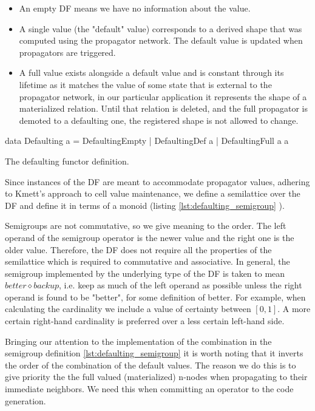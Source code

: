 \begin{itemize}
\item An empty DF means we have no information about the value.
\item A single value (the "default" value) corresponds to a derived
  shape that was computed using the propagator network. The default
  value is updated when propagators are triggered.
\item A full value exists alongside a default value and is constant
  through its lifetime as it matches the value of some state that is
  external to the propagator network, in our particular application it
  represents the shape of a materialized relation. Until that relation
  is deleted, and the full propagator is demoted to a defaulting one,
  the registered shape is not allowed to change.
\end{itemize}

\begin{code}
  \begin{haskellcode}
    data Defaulting a =
      DefaultingEmpty
      | DefaultingDef a
      | DefaultingFull a a
  \end{haskellcode}

  \caption{\label{lst:defaulting_functor}The defaulting functor definition.}
\end{code}

Since instances of the DF are meant to accommodate propagator values,
adhering to Kmett's approach to cell value maintenance, we define a
semilattice over the DF and define it in terms of a monoid (listing
\ref{lst:defaulting_semigroup} ).

Semigroups are not commutative, so we give meaning to the order. The
left operand of the semigroup operator is the newer value and the
right one is the older value. Therefore, the DF does not require all
the properties of the semilattice which is required to commutative and
associative. In general, the semigroup implemented by the underlying
type of the DF is taken to mean
\(\mathit{better} \diamond \mathit{backup}\), i.e. keep as much of the
left operand as possible unless the right operand is found to be
"better", for some definition of better. For example, when calculating
the cardinality we include a value of certainty between
\(\left[0,1\right]\).  A more certain right-hand cardinality is
preferred over a less certain left-hand side.

Bringing our attention to the implementation of the 
combination in the semigroup definition \ref{lst:defaulting_semigroup}
it is worth noting that it inverts the order of the combination of the
default values. The reason we do this is to give priority the the full
valued (materialized) n-nodes when propagating to their immediate
neighbors. We need this when committing an operator to the code
generation.

